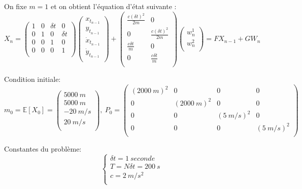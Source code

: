 \documentclass{article}
\begin{document}
On fixe $m=1$ et on obtient l'équation d'état suivante :
\[ X_n = \left ( 
   \begin{array}{cccc} %
      1 & 0 & \delta t & 0 \\
      0 & 1 & 0 & \delta t \\
      0 & 0 & 1 & 0 \\
      0 & 0 & 0 & 1 \\
   \end{array} \right )
   \left ( 
   \begin{array}{cccc} %
      x_{t_{n-1}} \\
      y_{t_{n-1}} \\
      \Dot{x}_{t_{n-1}} \\
      \Dot{y}_{t_{n-1}} \\
   \end{array} \right )
   + \left (
   \begin{array}{cc}
      \frac{c(\delta t)^2}{2m} & 0 \\
      0 & \frac{c(\delta t)^2}{2m} \\
      \frac{c\delta t}{m} & 0 \\
      0 & \frac{c\delta t}{m} \\
   \end{array} \right )
   \left (
   \begin{array}{c}
      w_n^1 \\
      w_n^2 \\
   \end{array} \right )
   = F X_{n-1} + G W_n
\]

Condition initiale: 
\[ m_0 = \mathbb{E}[X_0] = \left (
   \begin{array}{c}
      5000\ m \\
      5000\ m \\
      -20\ m/s \\
      20\ m/s \\
   \end{array} \right )
   ,\ P_0 = \left (
   \begin{array}{cccc}
      (2000\ m)^2 & 0 & 0 & 0 \\
      0 & (2000\ m)^2 & 0 & 0 \\
      0 & 0 & (5\ m/s)^2 & 0 \\
      0 & 0 & 0 & (5\ m/s)^2 \\
   \end{array} \right )
\]

Constantes du problème:
$$ \left\{
   \begin{array}{l}
      \delta t = 1\ seconde\\
      T = N \delta t = 200\ s \\
      c = 2\ m/s^2 \\
   \end{array} \right .$$
\end{document}
